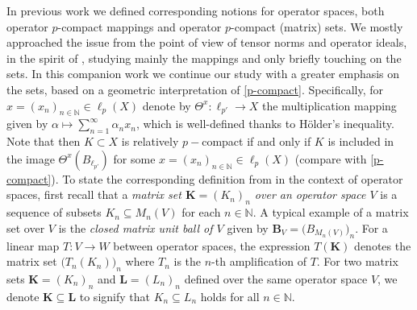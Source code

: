 \documentclass[11pt]{amsart}
\newcommand{\N}{{\mathbb{N}}}
\numberwithin{equation}{section}
\begin{document}
In previous work \cite{ChaDiGa-Operator-p-compact} we defined corresponding notions for operator spaces, both operator $p$-compact mappings and operator $p$-compact (matrix) sets. We mostly approached the issue from the point of view of tensor norms and operator ideals, in the spirit of \cite{Galicer-Lassalle-Turco}, studying mainly the mappings and only briefly touching on the sets. In this companion work we continue our study with a greater emphasis on the sets, based on a geometric interpretation of \eqref{p-compact}.
Specifically, for $x=(x_n)_{n \in \mathbb{N}} \in \ell_p(X)$ denote by $\Theta^x : \ell_{p'} \to X$ the multiplication mapping given by $\alpha \mapsto \sum_{n=1}^{\infty} \alpha_n x_n$, which is well-defined thanks to H\"older's inequality. Note  that then $K \subset X$ is relatively $p-$compact if and only if $K$ is included in the image $\Theta^x(B_{\ell_{p'}})$ for some $x=(x_n)_{n \in \mathbb{N}} \in \ell_p(X)$ (compare with \eqref{p-compact}).
To state the corresponding definition from \cite{ChaDiGa-Operator-p-compact} in the context of operator spaces, first recall that a \emph{matrix set $\mathbf{K} = (K_n)_n$ over an operator space $V$} is a sequence of subsets $K_n \subseteq M_n(V)$ for each $n\in\N$. A typical example of a matrix set over $V$ is the \emph{closed matrix unit ball of $V$} given by
$\mathbf{B}_V = \big( B_{M_n(V)} \big)_n$. For a linear map $T : V \to W$ between operator spaces, the expression $T(\mathbf{K})$ denotes the matrix set $\big(T_n(K_n)\big)_n$ where $T_n$ is the $n$-th amplification of $T$. For two matrix sets $\mathbf{K} = (K_n)_n$ and $\mathbf{L} = (L_n)_n$ defined over the same operator space $V$, we denote $\mathbf{K} \subseteq \mathbf{L}$ to signify that $K_n \subseteq L_n$ holds for all $n \in \mathbb{N}$.
\end{document}
